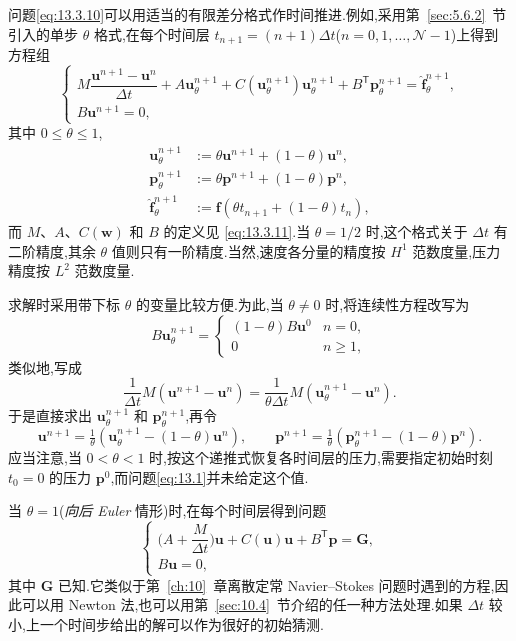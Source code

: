 问题\eqref{eq:13.3.10}可以用适当的有限差分格式作时间推进.例如,采用第~\ref{sec:5.6.2}~节引入的单步 \(\theta\) 格式,在每个时间层 \(t_{n+1}=(n+1)\Delta t\)(\(n=0,1,\ldots,\mathcal N-1\))上得到方程组
\begin{equation}\label{eq:13.4.1}
  \begin{cases}
    M\dfrac{\boldsymbol{u}^{n+1}-\boldsymbol{u}^n}{\Delta t}
      +A\boldsymbol{u}_\theta^{n+1}+C(\boldsymbol{u}_\theta^{n+1})\boldsymbol{u}_\theta^{n+1}
      +B^{\mathsf T}\boldsymbol{p}_\theta^{n+1}=\widehat{\boldsymbol{f}}_\theta^{n+1},\\[4pt]
    B\boldsymbol{u}^{n+1}=0,
  \end{cases}
\end{equation}
其中 \(0\le\theta\le1\),
\[
  \begin{aligned}
    \boldsymbol{u}_\theta^{n+1}&:=\theta\boldsymbol{u}^{n+1}+(1-\theta)\boldsymbol{u}^n,\\
    \boldsymbol{p}_\theta^{n+1}&:=\theta\boldsymbol{p}^{n+1}+(1-\theta)\boldsymbol{p}^n,\\
    \widehat{\boldsymbol{f}}_\theta^{n+1}&:=\boldsymbol{f}(\theta t_{n+1}+(1-\theta)t_n),
  \end{aligned}
\]
而 \(M\)、\(A\)、\(C(\boldsymbol{w})\) 和 \(B\) 的定义见
\eqref{eq:13.3.11}.当 \(\theta=1/2\) 时,这个格式关于 \(\Delta t\) 有二阶精度,其余 \(\theta\) 值则只有一阶精度.当然,速度各分量的精度按 \(H^1\) 范数度量,压力精度按 \(L^2\) 范数度量.

求解时采用带下标 \(\theta\) 的变量比较方便.为此,当 \(\theta\ne0\) 时,将连续性方程改写为
\[
  B\boldsymbol{u}_\theta^{n+1}=
    \begin{cases}
      (1-\theta)B\boldsymbol{u}^0 & n=0,\\
      0 & n\ge1,
    \end{cases}
\]
类似地,写成
\[
  \frac1{\Delta t}M(\boldsymbol{u}^{n+1}-\boldsymbol{u}^n)
    =\frac1{\theta\Delta t}M(\boldsymbol{u}_\theta^{n+1}-\boldsymbol{u}^n).
\]
于是直接求出 \(\boldsymbol{u}_\theta^{n+1}\) 和 \(\boldsymbol{p}_\theta^{n+1}\),再令
\[
  \boldsymbol{u}^{n+1}=\tfrac1\theta(\boldsymbol{u}_\theta^{n+1}-(1-\theta)\boldsymbol{u}^n),
  \qquad
  \boldsymbol{p}^{n+1}=\tfrac1\theta(\boldsymbol{p}_\theta^{n+1}-(1-\theta)\boldsymbol{p}^n).
\]
应当注意,当 \(0<\theta<1\) 时,按这个递推式恢复各时间层的压力,需要指定初始时刻 \(t_0=0\) 的压力 \(\boldsymbol{p}^0\),而问题\eqref{eq:13.1}并未给定这个值.

当 \(\theta=1\)(\emph{向后 Euler} 情形)时,在每个时间层得到问题
\begin{equation}\label{eq:13.4.2}
  \begin{cases}
    \biggl(A+\dfrac{M}{\Delta t}\biggr)\boldsymbol{u}
       +C(\boldsymbol{u})\boldsymbol{u}+B^{\mathsf T}\boldsymbol{p}=\boldsymbol{G},\\[2pt]
    B\boldsymbol{u}=0,
  \end{cases}
\end{equation}
其中 \(\boldsymbol{G}\) 已知.它类似于第~\ref{ch:10}~章离散定常 Navier--Stokes 问题时遇到的方程,因此可以用 Newton 法,也可以用第~\ref{sec:10.4}~节介绍的任一种方法处理.如果 \(\Delta t\) 较小,上一个时间步给出的解可以作为很好的初始猜测.

